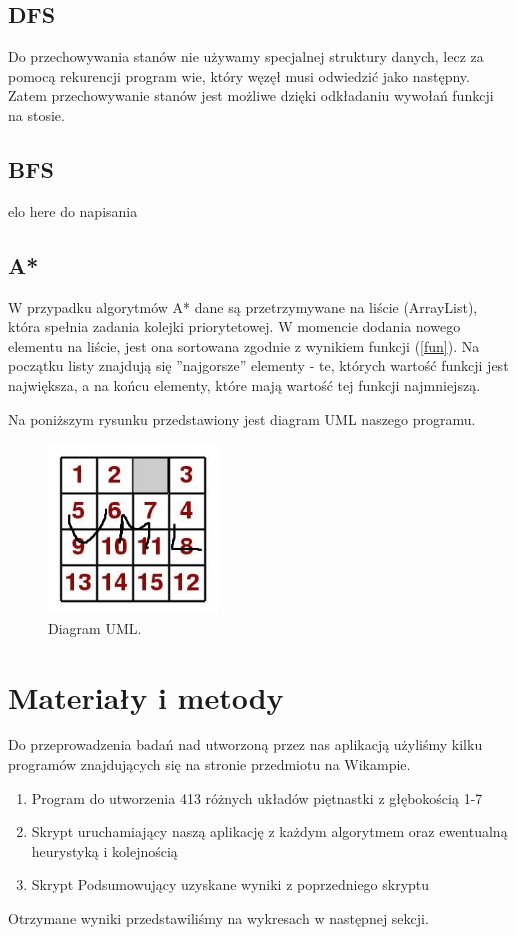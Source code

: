 \documentclass{classrep}
\begin{document}
\subsection{DFS}
Do przechowywania stanów nie używamy specjalnej struktury danych, lecz za pomocą rekurencji program wie, który węzęł musi odwiedzić jako następny. Zatem przechowywanie stanów jest możliwe dzięki odkładaniu wywołań funkcji na stosie.
\subsection{BFS}
{\color{red} elo here do napisania}

\subsection{A*}
W przypadku algorytmów A* dane są przetrzymywane na liście (ArrayList), która spełnia zadania kolejki priorytetowej. W momencie dodania nowego elementu na liście, jest ona sortowana zgodnie z wynikiem funkcji (\ref{fun}). Na początku listy znajdują się ''najgorsze'' elementy - te, których wartość funkcji jest największa, a na końcu elementy, które mają wartość tej funkcji najmniejszą.

Na poniższym rysunku przedstawiony jest diagram UML naszego programu.
\begin{figure}[h!]
    \centering
    \includegraphics[width=0.4\textwidth]{uml.jpg}
    \caption{Diagram UML.}
\end{figure}
\newpage

\section{Materiały i metody}
Do przeprowadzenia badań nad utworzoną przez nas aplikacją użyliśmy kilku programów znajdujących się na stronie przedmiotu na Wikampie.
\begin{enumerate}
\item Program do utworzenia 413 różnych układów piętnastki z głębokością 1-7
\item Skrypt uruchamiający naszą aplikację z każdym algorytmem oraz ewentualną heurystyką i kolejnością
\item Skrypt Podsumowujący uzyskane wyniki z poprzedniego skryptu
\end{enumerate}
Otrzymane wyniki przedstawiliśmy na wykresach w następnej sekcji.
\end{document}
